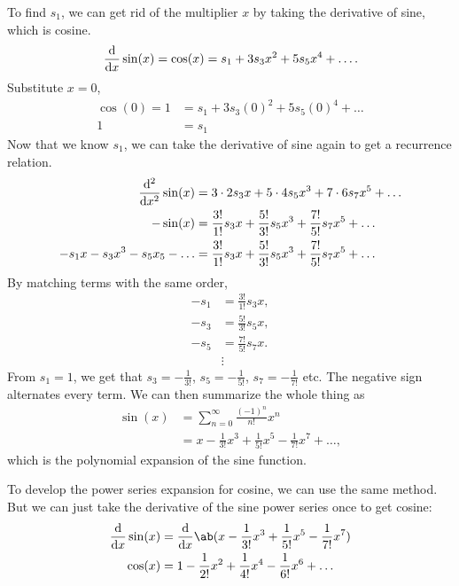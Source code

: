 To find $s_1$, we can get rid of the multiplier $x$ by taking the derivative of sine, which is cosine.
\begin{equation}
	\odv*{\sin(x)}{x} = \cos(x) = s_1 + 3s_3x^2 + 5s_5x^4 + \dots.
\end{equation}
Substitute $x = 0$,
\begin{align}
	\cos(0) = 1 &= s_1 + 3s_3(0)^2 + 5s_5(0)^4 + \dots \\
	1 &= s_1
\end{align}
Now that we know $s_1$, we can take the derivative of sine again to get a recurrence relation.
\begin{align}
	\odv*[order = 2]{\sin(x)}{x} &= 3\cdot 2s_3x + 5\cdot 4s_5x^3 + 7\cdot 6s_7x^5 + \dots \\
	-\sin(x) &= \frac{3!}{1!}s_3x + \frac{5!}{3!}s_5x^3 + \frac{7!}{5!}s_7x^5 + \dots \\
	-s_1x - s_3x^3 - s_5x_5 - \dots &= \frac{3!}{1!}s_3x + \frac{5!}{3!}s_5x^3 + \frac{7!}{5!}s_7x^5 + \dots
\end{align}
By matching terms with the same order,
\begin{equation}	
	\begin{aligned}
		-s_1 &= \frac{3!}{1!}s_3x, \\
		-s_3 &= \frac{5!}{3!}s_5x, \\
		-s_5 &= \frac{7!}{5!}s_7x. \\
			 &\vdots
	\end{aligned}
\end{equation}
From $s_1 = 1$, we get that $s_3 = -\frac{1}{3!}$, $s_5 = -\frac{1}{5!}$, $s_7 = -\frac{1}{7!}$ etc. The negative sign alternates every term. We can then summarize the whole thing as
\begin{align}
	\sin(x) &= \sum_{n = 0}^{\infty}\frac{(-1)^n}{n!}x^n \\
			&= x - \frac{1}{3!}x^3 + \frac{1}{5!}x^5 - \frac{1}{7!}x^7 + \dots,
\end{align}
which is the polynomial expansion of the sine function.

To develop the power series expansion for cosine, we can use the same method. But we can just take the derivative of the sine power series once to get cosine:
\begin{align}
	\odv*{\sin(x)}{x} &= \odv*{\ab(x - \frac{1}{3!}x^3 + \frac{1}{5!}x^5 - \frac{1}{7!}x^7)}{x} \\
	\cos(x) &= 1 - \frac{1}{2!}x^2 + \frac{1}{4!}x^4 - \frac{1}{6!}x^6 + \dots 
\end{align}

